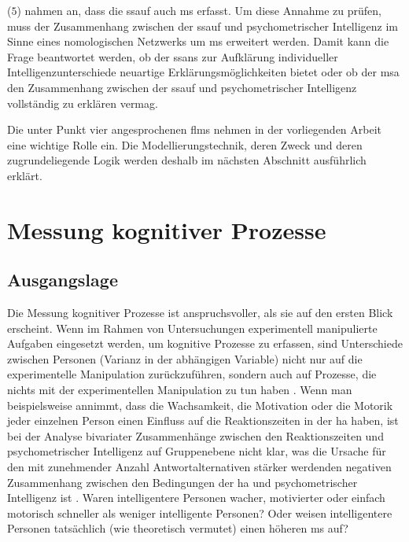 \documentclass[11pt, twoside, a4paper]{book}		%
\begin{document}
($5$) \citeauthor{Melnick2013} nahmen an, dass die \gls{ssauf} auch \gls{ms} erfasst. Um diese Annahme zu prüfen, muss der Zusammenhang zwischen der \gls{ssauf}
und psychometrischer Intelligenz im Sinne eines nomologischen Netzwerks \citep{Cronbach1955} um \gls{ms} erweitert werden. Damit kann die Frage beantwortet werden, ob der \gls{ssans} zur Aufklärung individueller Intelligenzunterschiede neuartige Erklärungsmöglichkeiten bietet oder ob der \gls{msa} den Zusammenhang zwischen der \gls{ssauf} und psychometrischer Intelligenz vollständig zu erklären vermag.

Die unter Punkt vier angesprochenen \glspl{flm}  nehmen in der vorliegenden Arbeit eine wichtige Rolle ein.
Die Modellierungstechnik, deren Zweck und deren zugrundeliegende Logik werden deshalb im nächsten Abschnitt ausführlich erklärt.




\section{Messung kognitiver Prozesse \label{sec:Messung_kognitiver_Prozesse}}

\subsection{Ausgangslage}

Die Messung kognitiver Prozesse ist anspruchsvoller, als sie auf den ersten Blick erscheint. Wenn im Rahmen von Untersuchungen experimentell manipulierte Aufgaben eingesetzt werden, um kognitive Prozesse zu erfassen, sind Unterschiede zwischen Personen (Varianz in der abhängigen Variable) nicht nur auf die experimentelle Manipulation zurückzuführen, sondern auch auf Prozesse, die nichts mit der experimentellen Manipulation zu tun haben \citep[]{Jensen1982b, Miller2013, Neubauer1997a, Schweizer2007, Unsworth2007, vanZomeren1994}.%
Wenn man beispielsweise annimmt, dass die Wachsamkeit, die Motivation oder die Motorik jeder einzelnen Person einen Einfluss auf die Reaktionszeiten in der \gls{ha} haben, ist bei der Analyse bivariater Zusammenhänge zwischen den Reaktionszeiten und psychometrischer Intelligenz auf Gruppenebene nicht klar, was die Ursache für den mit zunehmender Anzahl Antwortalternativen stärker werdenden negativen Zusammenhang zwischen den Bedingungen der \gls{ha} und psychometrischer Intelligenz ist \citep{Sheppard2008, Vernon1984}. Waren intelligentere Personen wacher, motivierter oder einfach motorisch schneller als weniger intelligente Personen? Oder weisen intelligentere Personen tatsächlich (wie theoretisch vermutet) einen höheren \gls{ms} auf?
\end{document}
